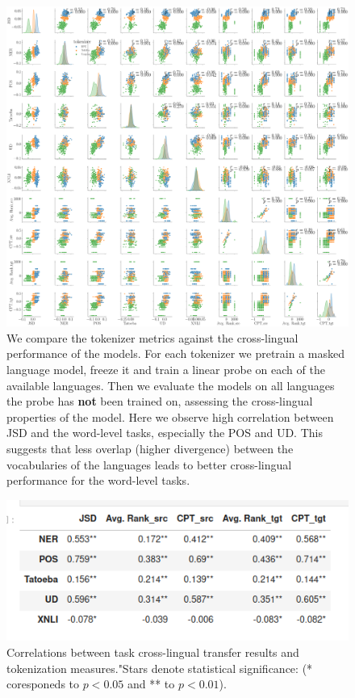 \begin{figure}[H]
    \centering
    \includegraphics[width=\textwidth]{img/temp/X_pair_analysis_20L.png}
    \caption{We compare the tokenizer metrics against the cross-lingual performance of the models. For each tokenizer we pretrain a masked language model, freeze it and train a linear probe on each of the available languages. Then we evaluate the models on all languages the probe has \textbf{not} been trained on, assessing the cross-lingual properties of the model. Here we observe high correlation between JSD and the word-level tasks, especially the POS and UD. This suggests that less overlap (higher divergence) between the vocabularies of the languages leads to better cross-lingual performance for the word-level tasks.
    } 
    \label{fig:X_pair_analysis_20L}
\end{figure}



\begin{figure}[H]
    \centering
    \includegraphics[width=\textwidth]{img/temp/corr_x_lang_20l.png}
    \caption{Correlations between task cross-lingual transfer results and tokenization measures."Stars denote statistical significance: (* coresponeds to $p<0.05$ and ** to $p<0.01$).}
    \label{fig:corr_x_lang_20l}
\end{figure}

